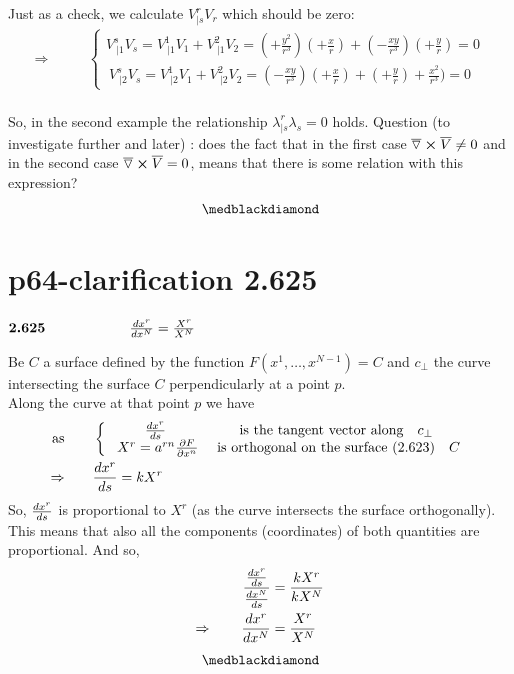 Just as a check, we calculate $V^r_{|s}V_r$ which should be zero:
\begin{align}
\Rightarrow \quad\quad &\left \{ \begin{array}{c}V^s_{\ |1}V_s = V^1_{\ |1}V_1+V^2_{\ |1}V_2 = (+\frac{y^2}{r^3})(+\frac{x}{r})+ (-\frac{xy}{r^3})(+\frac{y}{r}) =0\\
\ V^s_{\ |2}V_s = V^1_{\ |2}V_1+V^2_{\ |2}V_2 = (-\frac{xy}{r^3})(+\frac{x}{r})+ (+\frac{y}{r})+\frac{x^2}{r^3}) = 0
\end{array} \right.
\end{align}\\
So, in the second example the relationship $\lambda^r_{|s}\lambda_s = 0$ holds.
Question (to investigate further and later) : does the fact that in the first case $\overline{\boldsymbol{{\triangledown}}} \boldsymbol{\times} \overline{V}  \ne 0$ and in the second case $\overline{\boldsymbol{{\triangledown}}} \boldsymbol{\times} \overline{V}= 0$, means that there is some relation with this expression?
$$\medblackdiamond$$
\newpage

\section{p64-clarification 2.625}
\begin{tcolorbox}
$\textbf{2.625} \quad\quad\quad\quad\quad\quad \dv{ x^r}{x^N} = \frac{X^r}{X^N}$
\end{tcolorbox}
Be $C$ a surface defined by the function $F(x^1,\dots, x^{N-1}) = C$ and  $c_{\perp}$ the curve intersecting the surface $C$ perpendicularly at a point $p$.\\
Along the curve at that point $p$ we have
\begin{align}
\text{as}\quad\quad & \left \{ \begin{array}{cc}
\dv{ x^r}{s}& \text{is the tangent vector along}\quad c_{\perp}\\
\ X^r = a^{rn}\pdv{F}{x^n}& \text{ is orthogonal on the surface (2.623)}\quad C\\
\end{array}\right.\\
\Rightarrow \quad\quad & \dv{ x^r}{s} = kX^r
\end{align}
So, $\dv{ x^r}{s}$ is proportional to $X^r$ (as the curve intersects the surface orthogonally). This means that also all the components (coordinates) of both quantities are proportional. And so,
\begin{align}
\frac{\dv{ x^r}{s}}{\dv{ x^N}{s}} &= \frac{kX^r}{kX^N}\\
\Rightarrow\quad\quad \dv{ x^r}{x^N} &= \frac{X^r}{X^N}
\end{align}
$$\medblackdiamond$$
\newpage


